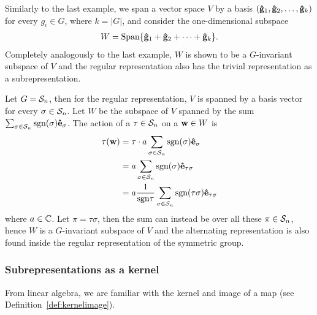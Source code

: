 \begin{example}\cite[Example 1.4.4.]{Sagan}
	Similarly to the last example, we span a vector space $V$ by a basis $(\mathbf{\hat{g}}_1, \mathbf{\hat{g}}_2, \dots, \mathbf{\hat{g}}_{k})$ for every $g_i \in G$, where $k = |G|$, and consider the one-dimensional subspace 
	\begin{align*}
		W = \text{Span}\{ \mathbf{\hat{g}}_1 + \mathbf{\hat{g}}_2 + \dots + \mathbf{\hat{g}}_k \}. 
	\end{align*}
	Completely analogously to the last example, $W$ is shown to be a $G$-invariant subspace of $V$ and the regular representation also has the trivial representation as a subrepresentation.
\end{example}

\begin{example}\cite[Example 1.4.4.]{Sagan}
	Let $G = \mathcal{S}_n$, then for the regular representation, $V$ is spanned by a basis vector for every $\sigma \in \mathcal{S}_n$. Let $W$ be the subspace of $V$ spanned by the sum $\sum_{\sigma \in \mathcal{S}_n} \text{sgn}(\sigma) \mathbf{\hat{e}}_{\sigma}$. The action of a $\tau \in \mathcal{S}_n$ on a $\mathbf{w} \in W$ is
	{\allowdisplaybreaks\begin{align*}
		\tau (\mathbf{w}) &= \tau \cdot a\sum_{\sigma \in \mathcal{S}_n} \text{sgn}(\sigma) \mathbf{\hat{e}}_{\sigma} \\
		&= a \sum_{\sigma \in \mathcal{S}_n} \text{sgn}(\sigma) \mathbf{\hat{e}}_{\tau\sigma} \\
		&= a \frac{1}{\text{sgn}\tau} \sum_{\sigma \in \mathcal{S}_n} \text{sgn}(\tau\sigma) \mathbf{\hat{e}}_{\tau\sigma} 
	\end{align*}}
	where $a \in \mathbb{C}$. Let $\pi = \tau\sigma$, then the sum can instead be over all these $\pi \in \mathcal{S}_n$, hence $W$ is a $G$-invariant subspace of $V$ and the alternating representation is also found inside the regular representation of the symmetric group.
\end{example}

\subsubsection{Subrepresentations as a kernel}

From linear algebra, we are familiar with the kernel and image of a map (see Definition~\ref{def:kernelimage}).

